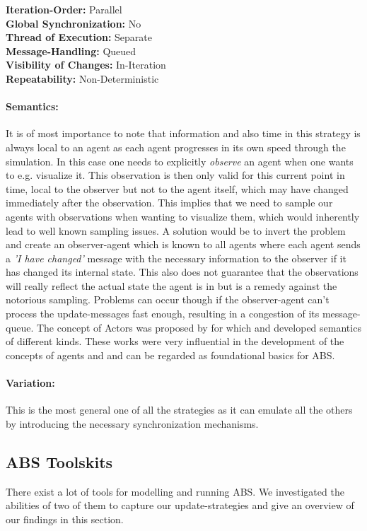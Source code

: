 \textbf{Iteration-Order:} Parallel \\
\textbf{Global Synchronization:} No \\
\textbf{Thread of Execution:} Separate \\
\textbf{Message-Handling:} Queued \\
\textbf{Visibility of Changes:}	In-Iteration \\
\textbf{Repeatability:}	Non-Deterministic

\paragraph{Semantics:} It is of most importance to note that information and also time in this strategy is always local to an agent as each agent progresses in its own speed through the simulation. In this case one needs to explicitly \textit{observe} an agent when one wants to e.g. visualize it. This observation is then only valid for this current point in time, local to the observer but not to the agent itself, which may have changed immediately after the observation. This implies that we need to sample our agents with observations when wanting to visualize them, which would inherently lead to well known sampling issues. A solution would be to invert the problem and create an observer-agent which is known to all agents where each agent sends a \textit{'I have changed'} message with the necessary information to the observer if it has changed its internal state. This also does not guarantee that the observations will really reflect the actual state the agent is in but is a remedy against the notorious sampling. Problems can occur though if the observer-agent can't process the update-messages fast enough, resulting in a congestion of its message-queue. 
The concept of Actors was proposed by \cite{hewitt_universal_1973} for which \cite{greif_semantics_1975} and \cite{clinger_foundations_1981} developed semantics of different kinds. These works were very influential in the development of the concepts of agents and and can be regarded as foundational basics for ABS.

\paragraph{Variation:} This is the most general one of all the strategies as it can emulate all the others by introducing the necessary synchronization mechanisms.



\subsection{ABS Toolskits}
There exist a lot of tools for modelling and running ABS. We investigated the abilities of two of them to capture our update-strategies and give an overview of our findings in this section.

